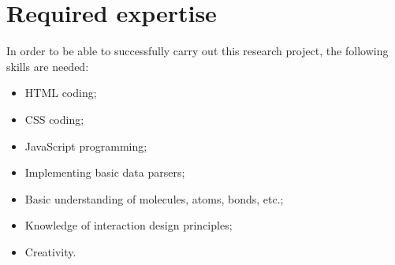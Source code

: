 \chapter{Required expertise}

In order to be able to successfully carry out this research project, the following skills are needed:
\begin{itemize}
\item HTML coding;
\item CSS coding;
\item JavaScript programming;
\item Implementing basic data parsers;
\item Basic understanding of molecules, atoms, bonds, etc.;
\item Knowledge of interaction design principles;
\item Creativity.
\end{itemize}
